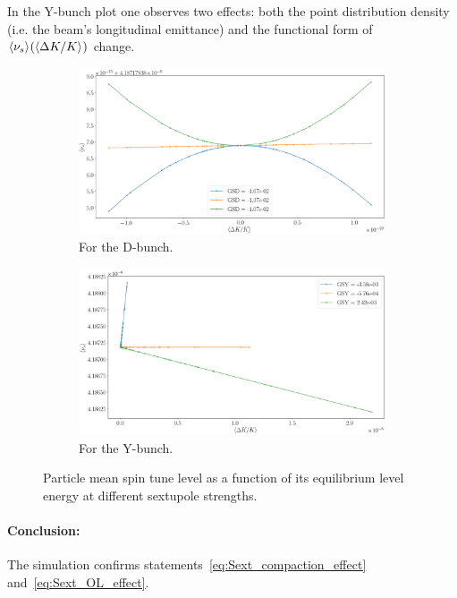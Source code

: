 In the Y-bunch plot one observes two effects: both the point distribution density (i.e. the beam's longitudinal emittance) and the functional form of $\avg{\nu_s}(\avg{\Delta K/K})$ change.

\begin{figure}[h]
	\centering
	\begin{subfigure}{\linewidth}
		\includegraphics[width=\linewidth]{images/decoh_sim/propdef/stune_vs_dkok_SS_D}
		\caption{For the D-bunch.}
	\end{subfigure}
	\begin{subfigure}{\linewidth}
		\includegraphics[width=\linewidth]{images/decoh_sim/propdef/stune_vs_dkok_SS_Y}
		\caption{For the Y-bunch.}
	\end{subfigure}
	\caption{Particle mean spin tune level as a function of its equilibrium level energy at different sextupole strengths.\label{fig:ST_vs_dkok_for_sext_strenghts}}
\end{figure}

\paragraph{Conclusion:} The simulation confirms statements~\eqref{eq:Sext_compaction_effect} and~\eqref{eq:Sext_OL_effect}.
